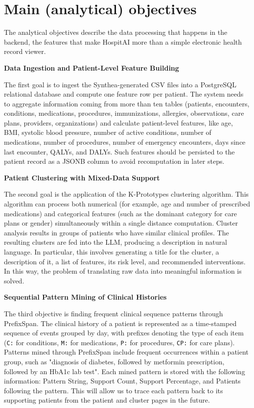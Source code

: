 \section{Main (analytical) objectives}

The analytical objectives describe the data processing that happens in the backend, the features that make HospitAI more than a simple electronic health record viewer.

\vspace{0.5em}
\noindent\textbf{Data Ingestion and Patient-Level Feature Building}

The first goal is to ingest the Synthea-generated CSV files into a PostgreSQL relational database and compute one feature row per patient. The system needs to aggregate information coming from more than ten tables (patients, encounters, conditions, medications, procedures, immunizations, allergies, observations, care plans, providers, organizations) and calculate patient-level features, like age, BMI, systolic blood pressure, number of active conditions, number of medications, number of procedures, number of emergency encounters, days since last encounter, QALYs, and DALYs. Such features should be persisted to the patient record as a JSONB column to avoid recomputation in later steps.

\vspace{0.5em}
\noindent\textbf{Patient Clustering with Mixed-Data Support}

The second goal is the application of the K-Prototypes clustering algorithm. This algorithm can process both numerical (for example, age and number of prescribed medications) and categorical features (such as the dominant category for care plans or gender) simultaneously within a single distance computation. Cluster analysis results in groups of patients who have similar clinical profiles. The resulting clusters are fed into the LLM, producing a description in natural language. In particular, this involves generating a title for the cluster, a description of it, a list of features, its risk level, and recommended interventions. In this way, the problem of translating raw data into meaningful information is solved.

\vspace{0.5em}
\noindent\textbf{Sequential Pattern Mining of Clinical Histories}

The third objective is finding frequent clinical sequence patterns through PrefixSpan. The clinical history of a patient is represented as a time-stamped sequence of events grouped by day, with prefixes denoting the type of each item (\texttt{C:} for conditions, \texttt{M:} for medications, \texttt{P:} for procedures, \texttt{CP:} for care plans). Patterns mined through PrefixSpan include frequent occurrences within a patient group, such as "diagnosis of diabetes, followed by metformin prescription, followed by an HbA1c lab test". Each mined pattern is stored with the following information: Pattern String, Support Count, Support Percentage, and Patients following the pattern. This will allow us to trace each pattern back to its supporting patients from the patient and cluster pages in the future.

